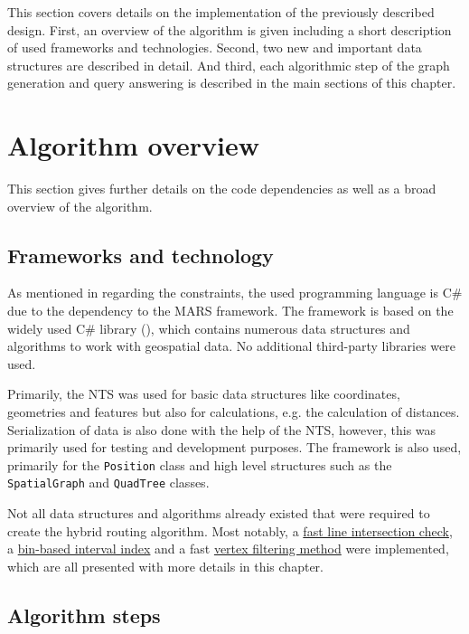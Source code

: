 
This section covers details on the implementation of the previously described design.
First, an overview of the algorithm is given including a short description of used frameworks and technologies.
Second, two new and important data structures are described in detail.
And third, each algorithmic step of the graph generation and query answering is described in the main sections of this chapter.

\section{Algorithm overview}

	This section gives further details on the code dependencies as well as a broad overview of the algorithm.

	\subsection{Frameworks and technology}
	\label{subsec:frameworks-technology}
	
		As mentioned in  regarding the constraints, the used programming language is C\# due to the dependency to the MARS framework.
		The  framework is based on the widely used C\# library  (), which contains numerous data structures and algorithms to work with geospatial data.
		No additional third-party libraries were used.
		
		Primarily, the NTS was used for basic data structures like coordinates, geometries and features but also for calculations, e.g. the calculation of distances.
		Serialization of data is also done with the help of the NTS, however, this was primarily used for testing and development purposes.
		The  framework is also used, primarily for the \texttt{Position} class and high level structures such as the \texttt{SpatialGraph} and \texttt{QuadTree} classes.
		
		Not all data structures and algorithms already existed that were required to create the hybrid routing algorithm.
		Most notably, a \hyperref[subsubsec:intersection-checks]{fast line intersection check}, a \hyperref[subsec:binindex]{bin-based interval index} and a fast \hyperref[subsec:shadow-areas]{vertex filtering method} were implemented, which are all presented with more details in this chapter.
			
	\subsection{Algorithm steps}
	\label{subsec:algorithm-steps}
	
